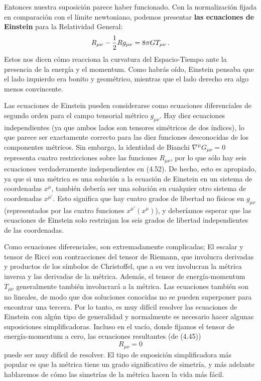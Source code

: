 \documentclass[11pt,b5paper,openany,twoside]{book}
\newcommand{\mn}{{\mu\nu}}
\begin{document}
Entonces nuestra suposición parece haber funcionado.
Con la normalización fijada en comparación con el límite newtoniano, podemos presentar {\bf las ecuaciones de Einstein} para la Relatividad General:
\begin{equation}
R_{\mn} -{1\over 2}R g_\mn = 8\pi G T_{\mn}\,.\label{4.52}
\end{equation}
Estos nos dicen cómo reacciona la curvatura del Espacio-Tiempo ante la presencia de la energía y el momentum.
Como habrás oído, Einstein pensaba que el lado izquierdo era bonito y geométrico, mientras que el lado derecho era algo menos convincente.

Las ecuaciones de Einstein pueden considerarse como ecuaciones diferenciales de segundo orden para el campo tensorial métrico $g_\mn$.
Hay diez ecuaciones independientes (ya que ambos lados son tensores simétricos de dos índices), lo que parece ser exactamente correcto para las diez funciones desconocidas de los componentes métricos.
Sin embargo, la identidad de Bianchi $\nabla^\mu G_\mn=0$ representa cuatro restricciones sobre las funciones $R_{\mn}$, por lo que sólo hay seis ecuaciones verdaderamente independientes en (4.52).
De hecho, esto es apropiado, ya que si una métrica es una solución a la ecuación de Einstein en un sistema de coordenadas $x^\mu$, también debería ser una solución en cualquier otro sistema de coordenadas $x^{\mu'}$.
Esto significa que hay cuatro grados de libertad no físicos en $g_\mn$ (representados por las cuatro funciones $x^{\mu'}(x^\mu)$), y deberíamos esperar que las ecuaciones de Einstein solo restrinjan los seis grados de libertad independientes de las coordenadas.

Como ecuaciones diferenciales, son extremadamente complicadas; El escalar y tensor de Ricci son contracciones del tensor de Riemann, que involucra derivadas y productos de los símbolos de Christoffel, que a su vez involucran la métrica inversa y las derivadas de la métrica.
Además, el tensor de energía-momentum $T_\mn$ generalmente también involucrará a la métrica.
Las ecuaciones también son no lineales, de modo que dos soluciones conocidas no se pueden superponer para encontrar una tercera.
Por lo tanto, es muy difícil resolver las ecuaciones de Einstein con algún tipo de generalidad y normalmente es necesario hacer algunas suposiciones simplificadoras.
Incluso en el vacío, donde fijamos el tensor de energía-momentum a cero, las ecuaciones resultantes (de (4.45))
\begin{equation}
R_\mn=0\label{4.53}
\end{equation}
puede ser muy difícil de resolver.
El tipo de suposición simplificadora más popular es que la métrica tiene un grado significativo de simetría, y más adelante hablaremos de cómo las simetrías de la métrica hacen la vida más fácil.
\end{document}
